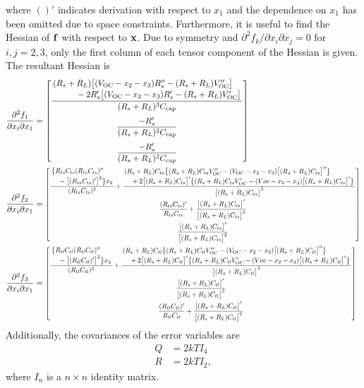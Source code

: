 \documentclass[../zhang_thesis.tex]{subfiles}
\begin{document}
where $()'$ indicates derivation with respect to $x_1$ and the dependence on $x_1$ has been omitted due to space constraints. Furthermore, it is useful to find the Hessian of $\mathbf{f}$ with respect to $\mathbf{x}$. Due to symmetry and $\partial^2 f_k/\partial x_i\partial x_j = 0$ for $i,j=2,3$, only the first column of each tensor component of the Hessian is given. The resultant Hessian is
\begin{align}
    \frac{\partial^2 f_1}{\partial x_i \partial x_1} & = \begin{bmatrix}
            \dfrac{\splitfrac{(R_s+R_L)\big[(V_\text{OC}-x_2-x_3)R_s''-(R_s+R_L)V_\text{OC}''\big]}{- 2R_s' \big[(V_\text{OC}-x_2-x_3)R_s' - (R_s+R_L)V_\text{OC}'\big]}}{(R_s+R_L)^3 C_\text{cap}} \\[3ex]
            \dfrac{-R_s'}{(R_s+R_L)^2 C_\text{cap}} \\[3ex]
            \dfrac{-R_s'}{(R_s+R_L)^2 C_\text{cap}}
        \end{bmatrix} \\
    \frac{\partial^2 f_2}{\partial x_i \partial x_1} & = \scalemath{0.8}{ \begin{bmatrix}
            \dfrac{\splitfrac{\big\{R_{ts}C_{ts}(R_{ts}C_{ts})''}{- \big[(R_{ts}C_{ts})'\big]^2\big\}x_2}}{(R_{ts}C_{ts})^2} + \dfrac{\splitfrac{(R_s+R_L)C_{ts}\big\{(R_s+R_L)C_{ts}V_\text{OC}'' - (V_\text{OC}-x_2-x_3)\big[(R_s+R_L)C_{ts}\big]''\big\}}{+ 2 \big[(R_s+R_L)C_{ts}\big]' \big\{(R_s+R_L)C_{ts}V_\text{OC}' - (Voc-x_2-x_3)\big[(R_s+R_L)C_{ts}\big]'\big\}}}{\big[(R_s+R_L)C_{ts}\big]^3} \\[3ex]
            \dfrac{(R_{ts}C_{ts})'}{R_{ts}C_{ts}}+\dfrac{\big[(R_s+R_L)C_{ts}\big]'}{\big[(R_s+R_L)C_{ts}\big]^2} \\[3ex]
            \dfrac{\big[(R_s+R_L)C_{ts}\big]'}{\big[(R_s+R_L)C_{ts}\big]^2}
        \end{bmatrix} } \\
    \frac{\partial^2 f_3}{\partial x_i \partial x_1} & = \scalemath{0.8}{ \begin{bmatrix}
            \dfrac{\splitfrac{\big\{R_{tl}C_{tl}(R_{tl}C_{tl})''}{- \big[(R_{tl}C_{tl})'\big]^2\big\}x_3}}{(R_{tl}C_{tl})^2} + \dfrac{\splitfrac{(R_s+R_L)C_{tl}\big\{(R_s+R_L)C_{tl}V_\text{OC}'' - (V_\text{OC}-x_2-x_3)\big[(R_s+R_L)C_{tl}\big]''\big\}}{+ 2 \big[(R_s+R_L)C_{tl}\big]' \big\{(R_s+R_L)C_{tl}V_\text{OC}' - (Voc-x_2-x_3)\big[(R_s+R_L)C_{tl}\big]'\big\}}}{\big[(R_s+R_L)C_{tl}\big]^3} \\[3ex]
            \dfrac{\big[(R_s+R_L)C_{tl}\big]'}{\big[(R_s+R_L)C_{tl}\big]^2} \\[3ex]
            \dfrac{(R_{tl}C_{tl})'}{R_{tl}C_{tl}}+\dfrac{\big[(R_s+R_L)C_{tl}\big]'}{\big[(R_s+R_L)C_{tl}\big]^2}
        \end{bmatrix} }
\end{align}
Additionally, the covariances of the error variables are
\begin{align}
    Q & = 2kT I_4 \\
    R & = 2kT I_2,
\end{align}
where $I_n$ is a $n\times n$ identity matrix.
\end{document}
